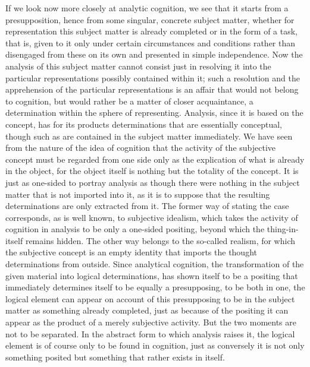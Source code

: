 If we look now more closely at analytic cognition,
we see that it starts from a presupposition,
hence from some singular, concrete subject matter,
whether for representation this subject matter is
already completed or in the form of a task,
that is, given to it only under
certain circumstances and conditions
rather than disengaged from these
on its own and presented in simple independence.
Now the analysis of this subject matter
cannot consist just in resolving it
into the particular representations
possibly contained within it;
such a resolution and the apprehension of
the particular representations is
an affair that would not belong to cognition,
but would rather be a matter of closer acquaintance,
a determination within the sphere of representing.
Analysis, since it is based on the concept,
has for its products determinations
that are essentially conceptual,
though such as are contained in the subject matter immediately.
We have seen from the nature of the idea of cognition
that the activity of the subjective concept
must be regarded from one side only as
the explication of what is already in the object,
for the object itself is nothing
but the totality of the concept.
It is just as one-sided to portray analysis
as though there were nothing in the subject matter
that is not imported into it,
as it is to suppose that
the resulting determinations are
only extracted from it.
The former way of stating the case corresponds,
as is well known, to subjective idealism,
which takes the activity of cognition in analysis
to be only a one-sided positing,
beyond which the thing-in-itself remains hidden.
The other way belongs to the so-called realism,
for which the subjective concept is an
empty identity that imports
the thought determinations from outside.
Since analytical cognition,
the transformation of the given material
into logical determinations,
has shown itself to be a positing
that immediately determines itself to
be equally a presupposing,
to be both in one,
the logical element can appear
on account of this presupposing to be in
the subject matter as something already completed,
just as because of the positing it can
appear as the product of a merely subjective activity.
But the two moments are not to be separated.
In the abstract form to which analysis raises it,
the logical element is of course
only to be found in cognition,
just as conversely it is not only something posited
but something that rather exists in itself.

